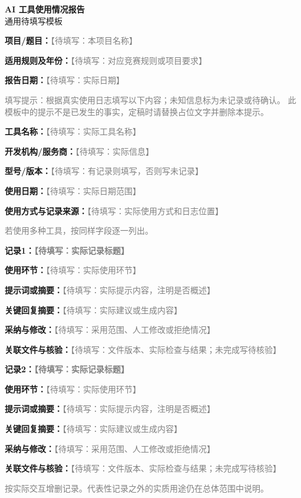 \documentclass[12pt,a4paper]{ctexart}
\newcommand{\field}[1]{\textcolor{gray}{【待填写：#1】}}
\newcommand{\usagerecord}[6]{%
  \par\medskip\noindent\textbf{#1}\par
  \noindent\textbf{使用环节：}#2\par
  \noindent\textbf{提示词或摘要：}#3\par
  \noindent\textbf{关键回复摘要：}#4\par
  \noindent\textbf{采纳与修改：}#5\par
  \noindent\textbf{关联文件与核验：}#6\par
}
\begin{document}
\begin{center}
{\LARGE\bfseries AI 工具使用情况报告}\\[0.5em]
{\small 通用待填写模板}
\end{center}

\noindent\textbf{项目/题目：}\field{本项目名称}\par
\noindent\textbf{适用规则及年份：}\field{对应竞赛规则或项目要求}\par
\noindent\textbf{报告日期：}\field{实际日期}\par

\textcolor{gray}{填写提示：根据真实使用日志填写以下内容；未知信息标为未记录或待确认。
此模板中的提示不是已发生的事实，定稿时请替换占位文字并删除本提示。}

\begin{mdframed}[
  linewidth=1pt,
  linecolor=black,
  innertopmargin=8pt,
  innerbottommargin=8pt,
  innerleftmargin=10pt,
  innerrightmargin=10pt
]
\par
\noindent\textbf{工具名称：}\field{实际工具名称}\par
\noindent\textbf{开发机构/服务商：}\field{实际信息}\par
\noindent\textbf{型号/版本：}\field{有记录则填写，否则写未记录}\par
\noindent\textbf{使用日期：}\field{实际日期范围}\par
\noindent\textbf{使用方式与记录来源：}\field{实际使用方式和日志位置}\par
\textcolor{gray}{若使用多种工具，按同样字段逐一列出。}\par

\medskip
{}\par

\usagerecord{记录1：\field{实际记录标题}}
  {\field{实际使用环节}}
  {\field{实际提示内容，注明是否概述}}
  {\field{实际建议或生成内容}}
  {\field{采用范围、人工修改或拒绝情况}}
  {\field{文件版本、实际检查与结果；未完成写待核验}}

\usagerecord{记录2：\field{实际记录标题}}
  {\field{实际使用环节}}
  {\field{实际提示内容，注明是否概述}}
  {\field{实际建议或生成内容}}
  {\field{采用范围、人工修改或拒绝情况}}
  {\field{文件版本、实际检查与结果；未完成写待核验}}

\textcolor{gray}{按实际交互增删记录。代表性记录之外的实质用途仍在总体范围中说明。}\par

\medskip
{}\par\nopagebreak[4]


\end{mdframed}
\end{document}
